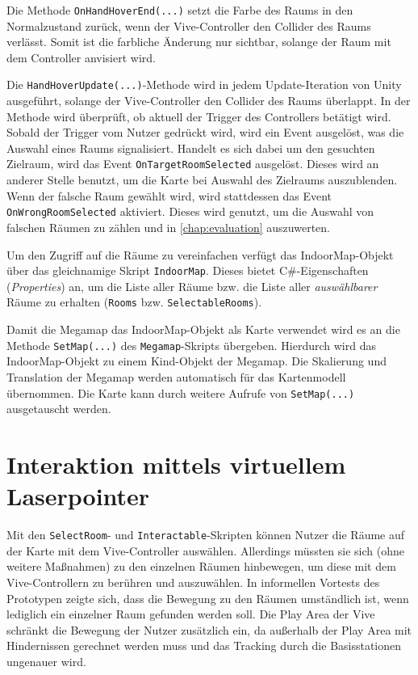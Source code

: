 Die Methode \lstinline|OnHandHoverEnd(...)| setzt die Farbe des Raums in den Normalzustand zurück, wenn der Vive-Controller den Collider des Raums verlässt.
Somit ist die farbliche Änderung nur sichtbar, solange der Raum mit dem Controller anvisiert wird.

Die \lstinline|HandHoverUpdate(...)|-Methode wird in jedem Update-Iteration von Unity ausgeführt, solange der Vive-Controller den Collider des Raums überlappt.
In der Methode wird überprüft, ob aktuell der Trigger des Controllers betätigt wird.
Sobald der Trigger vom Nutzer gedrückt wird, wird ein Event ausgelöst, was die Auswahl eines Raums signalisiert.
Handelt es sich dabei um den gesuchten Zielraum, wird das Event \lstinline|OnTargetRoomSelected| ausgelöst.
Dieses wird an anderer Stelle benutzt, um die Karte bei Auswahl des Zielraums auszublenden.
Wenn der falsche Raum gewählt wird, wird stattdessen das Event \lstinline|OnWrongRoomSelected| aktiviert.
Dieses wird genutzt, um die Auswahl von falschen Räumen zu zählen und in \autoref{chap:evaluation} auszuwerten. 

Um den Zugriff auf die Räume zu vereinfachen verfügt das IndoorMap-Objekt über das gleichnamige Skript \lstinline|IndoorMap|.
Dieses bietet C\#-Eigenschaften (\emph{Properties}) an, um die Liste aller Räume bzw. die Liste aller \emph{auswählbarer} Räume zu erhalten (\lstinline|Rooms| bzw. \lstinline|SelectableRooms|).

Damit die Megamap das IndoorMap-Objekt als Karte verwendet wird es an die Methode \lstinline|SetMap(...)| des \lstinline|Megamap|-Skripts übergeben.
Hierdurch wird das IndoorMap-Objekt zu einem Kind-Objekt der Megamap.
Die Skalierung und Translation der Megamap werden automatisch für das Kartenmodell übernommen.
Die Karte kann durch weitere Aufrufe von \lstinline|SetMap(...)| ausgetauscht werden.

\section{Interaktion mittels virtuellem Laserpointer}
Mit den \lstinline|SelectRoom|- und \lstinline|Interactable|-Skripten können Nutzer die Räume auf der Karte mit dem Vive-Controller auswählen.
Allerdings müssten sie sich (ohne weitere Maßnahmen) zu den einzelnen Räumen hinbewegen, um diese mit dem Vive-Controllern zu berühren und auszuwählen.
In informellen Vortests des Prototypen zeigte sich, dass die Bewegung zu den Räumen umständlich ist, wenn lediglich ein einzelner Raum gefunden werden soll.
Die Play Area der Vive schränkt die Bewegung der Nutzer zusätzlich ein, da außerhalb der Play Area mit Hindernissen gerechnet werden muss und das Tracking durch die Basisstationen ungenauer wird.

